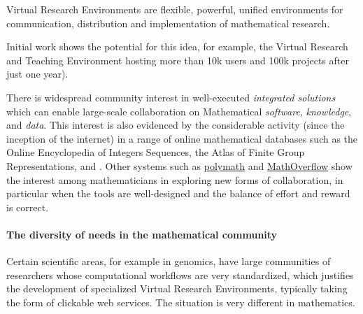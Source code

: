 Virtual Research Environments are flexible, powerful, unified
environments for communication, distribution and implementation of
mathematical research.

Initial work shows the potential for this idea, for example, the
Virtual Research and Teaching Environment \SMC hosting more than 10k
users and 100k projects after just one year).  

There is widespread community interest in well-executed
\emph{integrated solutions} which can enable large-scale collaboration
on Mathematical \emph{software}, \emph{knowledge}, and
\emph{data}. This interest is also evidenced by the considerable
activity (since the inception of the internet) in a range of online
mathematical databases such as the Online Encyclopedia of Integers
Sequences, the Atlas of Finite Group Representations, and \LMFDB.
%
Other systems such as \href{http://polymathprojects.org/}{polymath}
and \href{mathoverflow.net}{MathOverflow} show the interest among
mathematicians in exploring new forms of collaboration, in particular
when the tools are well-designed and the balance of effort and reward
is correct.






\paragraph{The diversity of needs in the mathematical community}

Certain scientific areas, for example in genomics, have large
communities of researchers whose computational workflows are very
standardized, which justifies the development of specialized Virtual
Research Environments, typically taking the form of clickable web
services. The situation is very different in mathematics.

